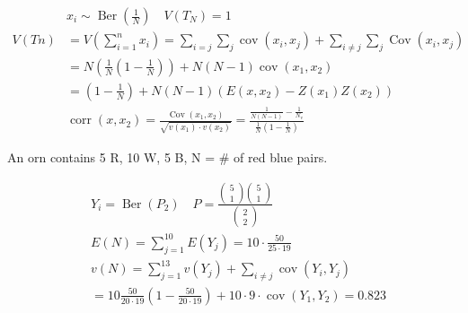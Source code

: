 \documentclass{article}
\begin{document}
\begin{align*}
    & x_i \sim  \operatorname{Ber}\left(\frac{1}{N}\right) \quad V\left(T_N\right)=1 \\
 V(T n)&=V\left(\sum_{i=1}^n x_i\right)=\sum_{i =j} \sum_j \operatorname{cov}\left( x_i, x_j\right)+\sum_{i \neq j} \sum_j \operatorname{Cov}\left(x_i, x_j\right)\\
    & =N\left(\frac{1}{N}\left(1-\frac{1}{N}\right)\right)+N(N-1) \operatorname{cov}\left(x_1, x_2\right) \\
& =\left(1-\frac{1}{N}\right)+N(N-1)\left(E\left(x, x_2\right)-Z\left(x_1\right) Z\left(x_2\right)\right) \\
& \operatorname{corr}\left(x, x_2\right)=\frac{\operatorname{Cov}\left(x_1, x_2\right)}{\sqrt{v\left(x_1\right) \cdot v\left(x_2\right)}}=\frac{\frac{1}{N(N-1)}-\frac{1}{N_v}}{\frac{1}{N}\left(1-\frac{1}{N}\right)}
\end{align*}
\begin{example}
    An orn contains 5 R, 10 W, 5 B, N = \# of red blue pairs.
\end{example}

\begin{align*}
    & Y_i=\operatorname{Ber}\left(P_2\right) \quad P=\frac{\left(\begin{array}{l}
        5 \\
        1
        \end{array}\right)\left(\begin{array}{l}
        5 \\
        1
        \end{array}\right)}{\left(\begin{array}{l}
        2 \\
        2
        \end{array}\right)} \\
        & E(N)=\sum_{j=1}^{10} E\left(Y_j\right)=10 \cdot \frac{50}{25\cdot 19} \\
        & v(N)=\sum_{j=1}^{13} v\left(Y_j\right)+\sum_{i\neq j} \operatorname{cov}\left(Y_i, Y_j\right) \\
        & =10 \frac{50}{20\cdot19}\left(1-\frac{50}{20\cdot19}\right)+10\cdot9\cdot \operatorname{cov}\left(Y_1, Y_2\right)=0.823 \\
        &
\end{align*}
\end{document}
